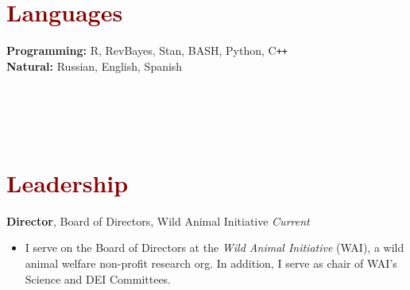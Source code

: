 \documentclass[11pt,margin,line]{resume}
\begin{document}
\begin{resume}
\begin{comment}
\textbf{Nontechnical}: Science Communication, Teaching, Hitchhiking, Public Speaking, Backpacking, Data Visualization, Computer Assembly \& Repair, Universal Design, Photography, Image Editing 
\end{comment}


\section{\large\textcolor{DarkRed}{Languages}}

\textbf{Programming:} R, RevBayes, Stan, BASH, Python, C\texttt{++}\\
\textbf{Natural:} Russian, English, Spanish\\\\\\\\\\


\section{\large\textcolor{DarkRed}{Leadership}}

\textbf{Director}, Board of Directors, Wild Animal Initiative \hfill \emph{Current}
\begin{itemize}[noitemsep]
\item I serve on the Board of Directors at the \textit{Wild Animal Initiative} (WAI), a wild animal welfare non-profit research org. In addition, I serve as chair of WAI's Science and DEI Committees.
\end{itemize} 
\vspace{-1.5mm}


\end{resume}
\end{document}
